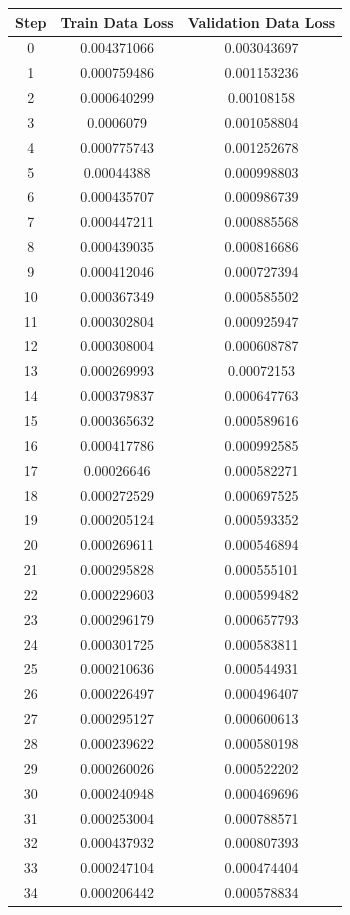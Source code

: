 \documentclass{jreport}		%
\begin{document}
\begin{table}
  \begin{tabular}{c|cc} \hline
Step&Train Data Loss&Validation Data Loss \\ \hline
0&0.004371066&0.003043697 \\
1&0.000759486&0.001153236 \\
2&0.000640299&0.00108158 \\
3&0.0006079&0.001058804 \\
4&0.000775743&0.001252678 \\
5&0.00044388&0.000998803 \\
6&0.000435707&0.000986739 \\
7&0.000447211&0.000885568 \\
8&0.000439035&0.000816686 \\
9&0.000412046&0.000727394 \\
10&0.000367349&0.000585502 \\
11&0.000302804&0.000925947 \\
12&0.000308004&0.000608787 \\
13&0.000269993&0.00072153 \\
14&0.000379837&0.000647763 \\
15&0.000365632&0.000589616 \\
16&0.000417786&0.000992585 \\
17&0.00026646&0.000582271 \\
18&0.000272529&0.000697525 \\
19&0.000205124&0.000593352 \\
20&0.000269611&0.000546894 \\
21&0.000295828&0.000555101 \\
22&0.000229603&0.000599482 \\
23&0.000296179&0.000657793 \\
24&0.000301725&0.000583811 \\
25&0.000210636&0.000544931 \\
26&0.000226497&0.000496407 \\
27&0.000295127&0.000600613 \\
28&0.000239622&0.000580198 \\
29&0.000260026&0.000522202 \\
30&0.000240948&0.000469696 \\
31&0.000253004&0.000788571 \\
32&0.000437932&0.000807393 \\
33&0.000247104&0.000474404 \\
34&0.000206442&0.000578834 \\

\end{tabular}
\end{table}
\end{document}
